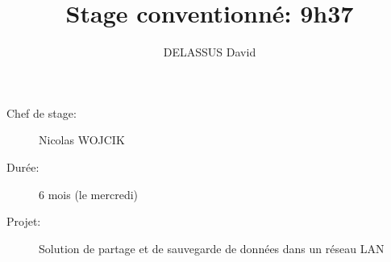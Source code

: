 \documentclass[a4paper]{article}
\begin{document}
     \title{Stage conventionné: 9h37}
     \author{DELASSUS David}
     \maketitle

     \begin{description}
          \item[Chef de stage:] Nicolas WOJCIK
          \item[Durée:] 6 mois (le mercredi)
          \item[Projet:] Solution de partage et de sauvegarde de données dans un réseau LAN
     \end{description}

     \pagebreak
     \tableofcontents

     
     
\end{document}
